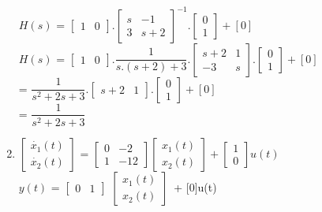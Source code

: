 \documentclass[14pt,a4paper]{article}
\begin{document}
\begin{enumerate}
	$H(s)$ = $\begin{bmatrix}1&0\end{bmatrix}.\begin{bmatrix} s&-1 \\ 3&s+2 \end{bmatrix}^{-1}. \begin{bmatrix} 0\\1 \end{bmatrix} + [0]$ \\
	
	$H(s)$ = $\begin{bmatrix}1&0\end{bmatrix}. \dfrac{1}{s.(s+2)+3}.\begin{bmatrix} s+2 & 1 \\ -3 & s	\end{bmatrix} .\begin{bmatrix} 0\\1 \end{bmatrix} + [0]$ \\
	
	= $\dfrac{1}{s^2 + 2s +3}. \begin{bmatrix} s+2 & 1 \end{bmatrix}.\begin{bmatrix} 0 \\ 1\end{bmatrix} + [0]$ \\
	= $\dfrac{1}{s^2 + 2s +3}$ \\
	
	\item
	$\begin{bmatrix}\dot{x_1}(t)\\ \dot{x_2}(t) \end{bmatrix}$ = $\begin{bmatrix} 0&-2 \\ 1&-12 \end{bmatrix} \begin{bmatrix}x_1(t) \\ x_2(t) \end{bmatrix} + \begin{bmatrix} 1\\0 \end{bmatrix}u(t)$ \\
	
	$y(t)$ = $\begin{bmatrix} 0&1 \end{bmatrix}$ $\begin{bmatrix} x_1(t)\\x_2(t) \end{bmatrix}$\ + [0]u(t) \\
	

\end{enumerate}
\end{document}
